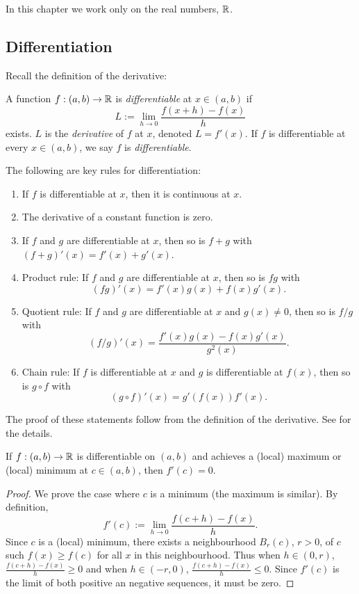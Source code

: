 \documentclass{article}
\begin{document}
In this chapter we work only on the real numbers, ${\mathbb{R}}$.

\subsection{Differentiation}

Recall the definition of the derivative:
\begin{definition}
A function $f:(a,b) \to {\mathbb{R}}$ is \emph{differentiable} at $x\in (a,b)$ if
\begin{equation*}
    L := \lim_{h \to 0} \frac{f(x+h) - f(x)}{h}
\end{equation*}
exists. $L$ is the \emph{derivative} of $f$ at $x$, denoted $L= f'(x)$. If $f$ is differentiable at every $x \in (a,b)$, we say $f$ is \emph{differentiable}.
\end{definition}

\begin{proposition}
The following are key rules for differentiation:
\begin{enumerate}
    \item If $f$ is differentiable at $x$, then it is continuous at $x$.
    \item The derivative of a constant function is zero.
    \item If $f$ and $g$ are differentiable at $x$, then so is $f+g$ with $(f+g)'(x) = f'(x) + g'(x)$.
    \item Product rule: If $f$ and $g$ are differentiable at $x$, then so is $fg$ with $$(fg)'(x) = f'(x) g(x) + f(x) g'(x).$$
    \item Quotient rule: If $f$ and $g$ are differentiable at $x$ and $g(x) \neq 0$, then so is $f/g$ with $$(f/g)'(x) = \frac{f'(x) g(x) - f(x) g'(x)}{g^2(x)}.$$
    \item Chain rule: If $f$ is differentiable at $x$ and $g$ is differentiable at $f(x)$, then so is $g \circ f$ with $$(g \circ f)'(x)= g'(f(x))f'(x).$$
\end{enumerate}
\end{proposition}

The proof of these statements follow from the definition of the derivative. See \cite[p.150]{realanalysis} for the details.

\begin{lemma}
\label{lemma:max_min}
If $f:(a,b) \to {\mathbb{R}}$ is differentiable on $(a,b)$ and achieves a (local) maximum or (local) minimum at $c \in (a,b)$, then $f'(c) = 0$.
\end{lemma}
\begin{proof}
We prove the case where $c$ is a minimum (the maximum is similar). By definition,
\begin{equation*}
    f'(c) := \lim_{h \to 0} \frac{f(c+h) - f(x)}{h}.
\end{equation*}
Since $c$ is a (local) minimum, there exists a neighbourhood $B_r(c)$, $r > 0$, of $c$ such $f(x) \geq f(c)$ for all $x$ in this neighbourhood. Thus when $h \in (0, r)$, $\frac{f(c+h) - f(x)}{h} \geq 0$ and when $h \in (-r,0)$, $\frac{f(c+h) - f(x)}{h} \leq 0$. Since $f'(c)$ is the limit of both positive an negative sequences, it must be zero.
\end{proof}
\end{document}
